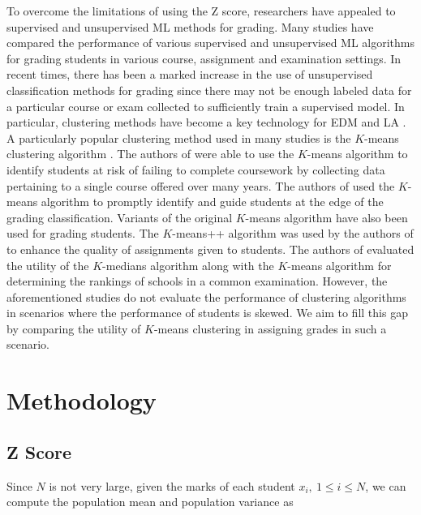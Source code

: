\documentclass[conference]{IEEEtran}
\begin{document}
To overcome the limitations of using the Z score, researchers have appealed to
supervised and unsupervised ML methods for grading. Many studies
\cite{badalPredictiveModellingAnalytics2023,
palkhiwalaAnalysisMachineLearning2022, bujangMulticlassPredictionModel2021,
gullImprovingLearningExperience2020} have compared the performance of various
supervised and unsupervised ML algorithms for grading students in various
course, assignment and examination settings. In recent times, there has been a
marked increase in the use of unsupervised classification methods for grading
since there may not be enough labeled data for a particular course or exam
collected to sufficiently train a supervised model. In particular, clustering
methods have become a key technology for EDM and LA
\cite{zhangBriefAnalysisKey2018}. A particularly popular clustering method used
in many studies is the $K$-means clustering algorithm
\cite{macqueenMethodsClassificationAnalysis1967}. The authors of
\cite{bucosStudentClusterAnalysis2020} were able to use the $K$-means algorithm
to identify students at risk of failing to complete coursework by collecting
data pertaining to a single course offered over many years. The authors of
\cite{wangAlgorithmStudentGrade2022} used the $K$-means algorithm to promptly
identify and guide students at the edge of the grading classification. Variants
of the original $K$-means algorithm have also been used for grading students.
The $K$-means++ algorithm was used by the authors of
\cite{jimenez-maciasStudentClusteringKMeans2024} to enhance the quality of
assignments given to students. The authors of
\cite{bhartiCentroidBasedClustering2024} evaluated the utility of the
$K$-medians algorithm along with the $K$-means algorithm for determining the
rankings of schools in a common examination. However, the aforementioned studies
do not evaluate the performance of clustering algorithms in scenarios where the
performance of students is skewed. We aim to fill this gap by comparing the
utility of $K$-means clustering in assigning grades in such a scenario.

\section{Methodology}
\label{sec:methodology}

\subsection{Z Score}
Since $N$ is not very large, given the marks of each student $x_i,\ 1 \le i \le
N$, we can compute the population mean and population variance as
\end{document}
